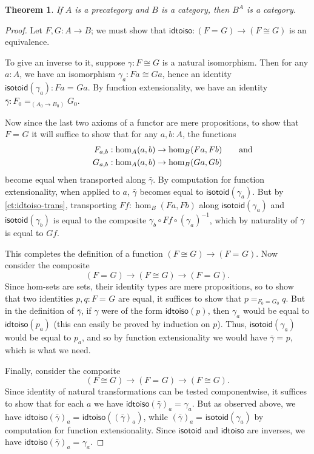 \documentclass{mscs}
\newcommand{\id}[3][]{\ensuremath{#2 =_{#1} #3}\xspace}
\newtheorem{thm}{Theorem}[section]
\numberwithin{equation}{section}
\newcommand{\inv}[1]{{#1}^{-1}}
\newcommand{\idtoiso}{\ensuremath{\mathsf{idtoiso}}\xspace}
\newcommand{\isotoid}{\ensuremath{\mathsf{isotoid}}\xspace}
\begin{document}
\begin{thm}\label{ct:functor-cat}
  If $A$ is a precategory and $B$ is a category, then $B^A$ is a category.
\end{thm}
\begin{proof}
  Let $F,G:A\to B$; we must show that $\idtoiso:(\id{F}{G}) \to (F\cong G)$ is an equivalence.

  To give an inverse to it, suppose $\gamma:F\cong G$ is a natural isomorphism.
  Then for any $a:A$, we have an isomorphism $\gamma_a:Fa \cong Ga$, hence an identity $\isotoid(\gamma_a):\id{Fa}{Ga}$.
  By function extensionality, we have an identity $\bar{\gamma}:\id[(A_0\to B_0)]{F_0}{G_0}$.

  Now since the last two axioms of a functor are mere propositions, to show that $\id{F}{G}$ it will suffice to show that for any $a,b:A$, the functions
  \begin{align*}
    F_{a,b}&:\hom_A(a,b) \to \hom_B(Fa,Fb)\mathrlap{\qquad\text{and}}\\
    G_{a,b}&:\hom_A(a,b) \to \hom_B(Ga,Gb)
  \end{align*}
  become equal when transported along $\bar\gamma$.
  By computation for function extensionality, when applied to $a$, $\bar\gamma$ becomes equal to $\isotoid(\gamma_a)$.
  But by \autoref{ct:idtoiso-trans}, transporting $Ff:\hom_B(Fa,Fb)$ along $\isotoid(\gamma_a)$ and $\isotoid(\gamma_b)$ is equal to the composite $\gamma_b\circ Ff\circ \inv{(\gamma_a)}$, which by naturality of $\gamma$ is equal to $Gf$.

  This completes the definition of a function $(F\cong G) \to (\id F G)$.
  Now consider the composite
  \[ (\id F G) \to (F\cong G) \to (\id F G). \]
  Since hom-sets are sets, their identity types are mere propositions, so to show that two identities $p,q:\id F G$ are equal, it suffices to show that $\id[\id{F_0}{G_0}]{p}{q}$.
  But in the definition of $\bar\gamma$, if $\gamma$ were of the form $\idtoiso(p)$, then $\gamma_a$ would be equal to $\idtoiso(p_a)$ (this can easily be proved by induction on $p$).
  Thus, $\isotoid(\gamma_a)$ would be equal to $p_a$, and so by function extensionality we would have $\id{\bar\gamma}{p}$, which is what we need.

  Finally, consider the composite
  \[(F\cong G)\to  (\id F G) \to (F\cong G). \]
  Since identity of natural transformations can be tested componentwise, it suffices to show that for each $a$ we have $\id{\idtoiso(\bar\gamma)_a}{\gamma_a}$.
  But as observed above, we have $\id{\idtoiso(\bar\gamma)_a}{\idtoiso((\bar\gamma)_a)}$, while $\id{(\bar\gamma)_a}{\isotoid(\gamma_a)}$ by computation for function extensionality.
  Since $\isotoid$ and $\idtoiso$ are inverses, we have $\id{\idtoiso(\bar\gamma)_a}{\gamma_a}$.
\end{proof}
\end{document}
